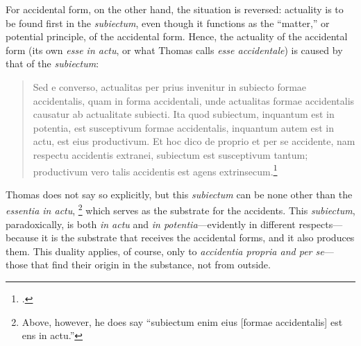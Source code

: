 For accidental form, on the other hand, the situation is reversed: actuality is to be found first in the \emph{subiectum}, even though it functions as the ``matter,'' or potential principle, of the accidental form. Hence, the actuality of the accidental form (its own \emph{esse in actu}, or what Thomas calls \emph{esse accidentale}) is caused by that of the \emph{subiectum}:
%
\begin{quotation}
Sed e converso, actualitas per prius invenitur in subiecto formae accidentalis, quam in forma accidentali, unde actualitas formae accidentalis causatur ab actualitate subiecti. Ita quod subiectum, inquantum est in potentia, est susceptivum formae accidentalis, inquantum autem est in actu, est eius productivum. Et hoc dico de proprio et per se accidente, nam respectu accidentis extranei, subiectum est susceptivum tantum; productivum vero talis accidentis est agens extrinsecum.\footcite[I, q.~77, a.~6, co.]{st:summa}
\end{quotation}
%
Thomas does not say so explicitly, but this \emph{subiectum} can be none other than the \emph{essentia in actu},%
%
\footnote{Above, however, he does say ``subiectum enim eius [formae accidentalis] est ens in actu.''} which serves as the substrate for the accidents. This \emph{subiectum}, paradoxically, is both \emph{in actu} and \emph{in potentia}---evidently in different respects---because it is the substrate that receives the accidental forms, and it also produces them. This duality applies, of course, only to \emph{accidentia propria and per se}---those that find their origin in the substance, not from outside.%
%
